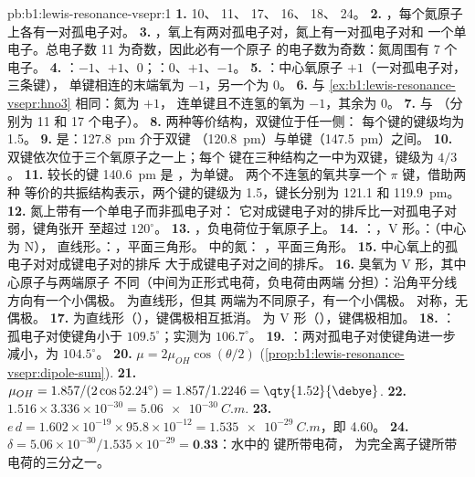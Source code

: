 \begin{solution}{pb:b1:lewis-resonance-vsepr:1}
\textbf{1.}  10、 11、 17、 16、 18、
 24。
\textbf{2.} ，每个氮原子上各有一对孤电子对。
\textbf{3.} ，氧上有两对孤电子对，氮上有一对孤电子对和
一个单电子。总电子数 11 为奇数，因此必有一个原子
的电子数为奇数：氮周围有 7 个电子。
\textbf{4.} ：$-1$、$+1$、$0$；：$0$、$+1$、$-1$。
\textbf{5.} ：中心氧原子 $+1$（一对孤电子对，三条键），
单键相连的末端氧为 $-1$，另一个为 0。
\textbf{6.} 与 \cref{ex:b1:lewis-resonance-vsepr:hno3} 相同：氮为 $+1$，
连单键且不连氢的氧为 $-1$，其余为 0。
\textbf{7.}  与 （分别为 11 和 17 个电子）。
\textbf{8.} 两种等价结构，双键位于任一侧：
每个键的键级均为 1.5。
\textbf{9.} 是：\qty{127.8}{pm} 介于双键
（\qty{120.8}{pm}）与单键（\qty{147.5}{pm}）之间。
\textbf{10.} 双键依次位于三个氧原子之一上；每个
 键在三种结构之一中为双键，键级为 $4/3$。
\textbf{11.} 较长的键 \qty{140.6}{pm} 是 ，为单键。
两个不连氢的氧共享一个 $\pi$ 键，借助两种
等价的共振结构表示，两个键的键级为 1.5，键长分别为 121.1 和
\qty{119.9}{pm}。
\textbf{12.} 氮上带有一个单电子而非孤电子对：
它对成键电子对的排斥比一对孤电子对弱，键角张开
至超过 $120^\circ$。
\textbf{13.} ，负电荷位于氧原子上。
\textbf{14.} ：，V 形。：（中心为 N），
直线形。：，平面三角形。 中的氮：
，平面三角形。
\textbf{15.} 中心氧上的孤电子对对成键电子对的排斥
大于成键电子对之间的排斥。
\textbf{16.} 臭氧为 V 形，其中心原子与两端原子
不同（中间为正形式电荷，负电荷由两端
分担）：沿角平分线方向有一个小偶极。 为直线形，但其
两端为不同原子，有一个小偶极。 对称，无偶极。
\textbf{17.}  为直线形（），键偶极相互抵消。
 为 V 形（），键偶极相加。
\textbf{18.} ：孤电子对使键角小于
$109.5^\circ$；实测为 $106.7^\circ$。
\textbf{19.} ：两对孤电子对使键角进一步减小，为 $104.5^\circ$。
\textbf{20.} $\mu = 2\mu_{OH}\cos(\theta/2)$
(\cref{prop:b1:lewis-resonance-vsepr:dipole-sum}).
\textbf{21.} $\mu_{OH} = 1.857/(2\cos 52.24^\circ) = 1.857/1.2246 =
\qty{1.52}{\debye}$.
\textbf{22.} $1.516 \times 3.336 \times 10^{-30} = \qty{5.06e-30}{C.m}$.
\textbf{23.} $e\,d = 1.602 \times 10^{-19} \times 95.8 \times 10^{-12} =
\qty{1.535e-29}{C.m}$，即 \qty{4.60}{\debye}。
\textbf{24.} $\delta = 5.06 \times 10^{-30}/1.535 \times 10^{-29} =
\textbf{0.33}$：水中的  键所带电荷，
为完全离子键所带电荷的三分之一。
\end{solution}
